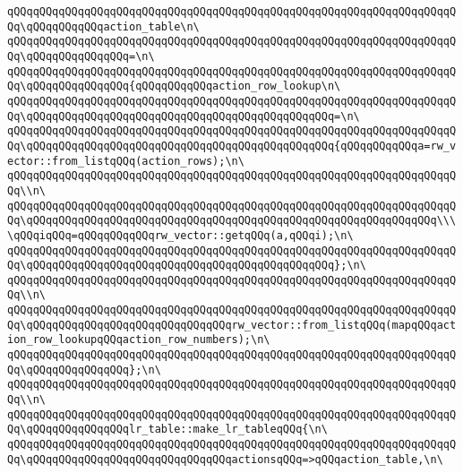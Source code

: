 \verb|qQQqqQQqqQQqqQQqqQQqqQQqqQQqqQQqqQQqqQQqqQQqqQQqqQQqqQQqqQQqqQQqqQQqqQQq\qQQqqQQqqQQqaction_table\n\|\newline
\verb|qQQqqQQqqQQqqQQqqQQqqQQqqQQqqQQqqQQqqQQqqQQqqQQqqQQqqQQqqQQqqQQqqQQqqQQq\qQQqqQQqqQQqqQQq=\n\|\newline
\verb|qQQqqQQqqQQqqQQqqQQqqQQqqQQqqQQqqQQqqQQqqQQqqQQqqQQqqQQqqQQqqQQqqQQqqQQq\qQQqqQQqqQQqqQQq{qQQqqQQqqQQqaction_row_lookup\n\|\newline
\verb|qQQqqQQqqQQqqQQqqQQqqQQqqQQqqQQqqQQqqQQqqQQqqQQqqQQqqQQqqQQqqQQqqQQqqQQq\qQQqqQQqqQQqqQQqqQQqqQQqqQQqqQQqqQQqqQQqqQQqqQQq=\n\|\newline
\verb|qQQqqQQqqQQqqQQqqQQqqQQqqQQqqQQqqQQqqQQqqQQqqQQqqQQqqQQqqQQqqQQqqQQqqQQq\qQQqqQQqqQQqqQQqqQQqqQQqqQQqqQQqqQQqqQQqqQQqqQQq{qQQqqQQqqQQqa=rw_vector::from_listqQQq(action_rows);\n\|\newline
\verb|qQQqqQQqqQQqqQQqqQQqqQQqqQQqqQQqqQQqqQQqqQQqqQQqqQQqqQQqqQQqqQQqqQQqqQQq\\n\|\newline
\verb|qQQqqQQqqQQqqQQqqQQqqQQqqQQqqQQqqQQqqQQqqQQqqQQqqQQqqQQqqQQqqQQqqQQqqQQq\qQQqqQQqqQQqqQQqqQQqqQQqqQQqqQQqqQQqqQQqqQQqqQQqqQQqqQQqqQQqqQQq\\\\qQQqiqQQq=qQQqqQQqqQQqrw_vector::getqQQq(a,qQQqi);\n\|\newline
\verb|qQQqqQQqqQQqqQQqqQQqqQQqqQQqqQQqqQQqqQQqqQQqqQQqqQQqqQQqqQQqqQQqqQQqqQQq\qQQqqQQqqQQqqQQqqQQqqQQqqQQqqQQqqQQqqQQqqQQqqQQq};\n\|\newline
\verb|qQQqqQQqqQQqqQQqqQQqqQQqqQQqqQQqqQQqqQQqqQQqqQQqqQQqqQQqqQQqqQQqqQQqqQQq\\n\|\newline
\verb|qQQqqQQqqQQqqQQqqQQqqQQqqQQqqQQqqQQqqQQqqQQqqQQqqQQqqQQqqQQqqQQqqQQqqQQq\qQQqqQQqqQQqqQQqqQQqqQQqqQQqqQQqrw_vector::from_listqQQq(mapqQQqaction_row_lookupqQQqaction_row_numbers);\n\|\newline
\verb|qQQqqQQqqQQqqQQqqQQqqQQqqQQqqQQqqQQqqQQqqQQqqQQqqQQqqQQqqQQqqQQqqQQqqQQq\qQQqqQQqqQQqqQQq};\n\|\newline
\verb|qQQqqQQqqQQqqQQqqQQqqQQqqQQqqQQqqQQqqQQqqQQqqQQqqQQqqQQqqQQqqQQqqQQqqQQq\\n\|\newline
\verb|qQQqqQQqqQQqqQQqqQQqqQQqqQQqqQQqqQQqqQQqqQQqqQQqqQQqqQQqqQQqqQQqqQQqqQQq\qQQqqQQqqQQqqQQqlr_table::make_lr_tableqQQq{\n\|\newline
\verb|qQQqqQQqqQQqqQQqqQQqqQQqqQQqqQQqqQQqqQQqqQQqqQQqqQQqqQQqqQQqqQQqqQQqqQQq\qQQqqQQqqQQqqQQqqQQqqQQqqQQqqQQqactionsqQQq=>qQQqaction_table,\n\|\newline
